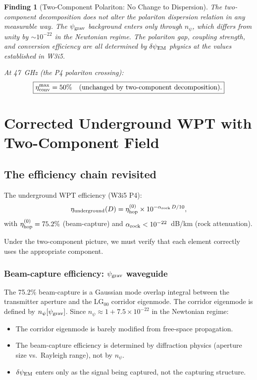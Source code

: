 \documentclass[11pt]{article}
\newtheorem{finding}{Finding}
\newcommand{\ee}[1]{\times 10^{#1}}
\newcommand{\psigrav}{\psi_{\rm grav}}
\newcommand{\dpsiEM}{\delta\psi_{\rm EM}}
\newcommand{\etahop}{\eta_{\rm hop}}
\newcommand{\alpharock}{\alpha_{\rm rock}}
\newcommand{\npsi}{n_\psi}
\begin{document}
\begin{finding}[Two-Component Polariton: No Change to Dispersion]
\label{find:polariton-dispersion}
The two-component decomposition does not alter the polariton dispersion
relation in any measurable way. The $\psigrav$ background enters only
through $\npsi$, which differs from unity by $\sim 10^{-22}$ in the
Newtonian regime. The polariton gap, coupling strength, and conversion
efficiency are all determined by $\dpsiEM$ physics at the values
established in W3i5.

At 47~GHz (the P4 polariton crossing):
\begin{equation}
\boxed{\eta_{\rm conv}^{\rm max} = 50\%
\quad\text{(unchanged by two-component decomposition).}}
\end{equation}
\end{finding}

\section{Corrected Underground WPT with Two-Component Field}
\label{sec:underground-WPT}

\subsection{The efficiency chain revisited}

The underground WPT efficiency (W3i5 P4):
\begin{equation}
\eta_{\rm underground}(D) = \etahop^{(0)} \times 10^{-\alpharock\,D/10},
\label{eq:eta-underground}
\end{equation}
with $\etahop^{(0)} = 75.2\%$ (beam-capture) and
$\alpharock < 10^{-22}$~dB/km (rock attenuation).

Under the two-component picture, we must verify that each element
correctly uses the appropriate component.

\subsubsection{Beam-capture efficiency: $\psigrav$ waveguide}

The 75.2\% beam-capture is a Gaussian mode overlap integral between the
transmitter aperture and the LG$_{00}$ corridor eigenmode. The corridor
eigenmode is defined by $\npsi[\psigrav]$. Since $\npsi \approx 1 +
7.5\ee{-22}$ in the Newtonian regime:
\begin{itemize}[nosep]
  \item The corridor eigenmode is barely modified from free-space
    propagation.
  \item The beam-capture efficiency is determined by diffraction physics
    (aperture size vs.\ Rayleigh range), not by $\npsi$.
  \item $\dpsiEM$ enters only as the signal being captured, not the
    capturing structure.
\end{itemize}
\end{document}
